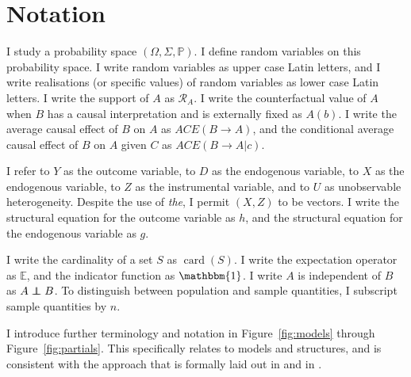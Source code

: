 \documentclass[12pt,a4paper,twoside]{article}
\newcommand\independent{\protect\mathpalette{\protect\independenT}{\perp}}
\def\independenT#1#2{\mathrel{\rlap{$#1#2$}\mkern2mu{#1#2}}}
\DeclareMathOperator*{\card}{card}
\numberwithin{equation}{section}
\begin{document}
\section*{Notation}
I study a probability space $(\Omega,\Sigma,\mathbb{P})$. I define random variables on this probability space. I write random variables as upper case Latin letters, and I write realisations (or specific values) of random variables as lower case Latin letters. I write the support of $A$ as $\mathcal{R}_A$. I write the counterfactual value of $A$ when $B$ has a causal interpretation and is externally fixed as $A(b)$. I write the average causal effect of $B$ on $A$ as $ACE(B\rightarrow A)$, and the conditional average causal effect of $B$ on $A$ given $C$ as $ACE(B\rightarrow A|c)$.

I refer to $Y$ as the outcome variable, to $D$ as the endogenous variable, to $X$ as the endogenous variable, to $Z$ as the instrumental variable, and to $U$ as unobservable heterogeneity. Despite the use of \emph{the}, I permit $(X,Z)$ to be vectors. I write the structural equation for the outcome variable as $h$, and the structural equation for the endogenous variable as $g$.  

I write the cardinality of a set $S$ as $\card (S)$. I write the expectation operator as $\mathbb{E}$, and the indicator function as $\mathbbm{1}$. I write $A$ is independent of $B$ as $A\independent B$. To distinguish between population and sample quantities, I subscript sample quantities by $n$. 

I introduce further terminology and notation in Figure~\ref{fig:models} through Figure~\ref{fig:partials}. This specifically relates to models and structures, and is consistent with the approach that is formally laid out in \cite{h50} and in \cite{krE50}. 
\end{document}
